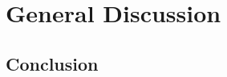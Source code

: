 \documentclass[dwyatte_dissertation.tex]{subfiles}
\begin{document}
\chapter{General Discussion}

\section{}

\section{Conclusion}



\end{document}
